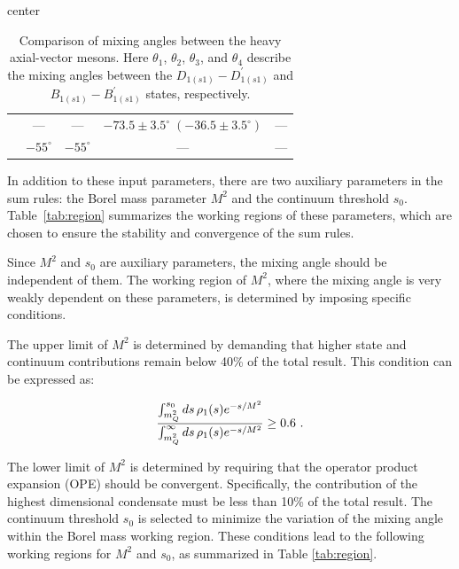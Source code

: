 \documentclass[prd,a4paper,preprint,preprintnumbers,nofootinbib,superscriptaddress]{revtex4-2}
\begin{document}
\begin{table}[hbt]
\begin{adjustbox}{center}
\begin{tabular}{lcccc}
\cite{Sun:2014wea}      & ---                  & ---                  & $-73.5 \pm 3.5^\circ \; (-36.5 \pm 3.5^\circ)$ & --- \\
\cite{Zhong:2008kd}     & $-55^\circ$          & $-55^\circ$          & ---                  & ---                  \\
\bottomrule
\end{tabular}
\end{adjustbox}
\caption{Comparison of mixing angles between the heavy axial-vector mesons. Here $\theta_1$, $\theta_2$, $\theta_3$, and $\theta_4$ describe the mixing angles between the $D_{1(s1)} - D_{1(s1)}^\prime$ and $B_{1(s1)} - B_{1(s1)}^\prime$ states, respectively.}
\label{tab:combined_table}
\end{table}

In addition to these input parameters, there are two  auxiliary parameters in the sum rules: the Borel mass parameter \(M^2\) and the continuum threshold \(s_0\). Table~\ref{tab:region} summarizes the working regions of these parameters, which are chosen to ensure the stability and convergence of the sum rules.


Since \(M^2\) and \(s_0\) are auxiliary parameters, the mixing angle should be independent of them. The working region of \(M^2\), where the mixing angle is very weakly dependent on these parameters, is determined by imposing specific conditions.

The upper limit of \(M^2\) is determined by demanding that higher state and continuum contributions remain below 40\% of the total result. This condition can be expressed as:

\begin{equation}
{\int_{m_Q^2}^{s_0} ds \, \rho_1(s) e^{-s/M^2} \over \int_{m_Q^2}^{\infty} ds \, \rho_1(s) e^{-s/M^2} } \geq 0.6~.
\end{equation}

The lower limit of \(M^2\) is determined by requiring that the operator product expansion (OPE) should be convergent. Specifically, the contribution of the highest dimensional condensate must be less than 10\% of the total result. The continuum threshold \(s_0\) is selected to minimize the variation of the mixing angle within the Borel mass working region. These conditions lead to the following working regions for \(M^2\) and \(s_0\), as summarized in Table \ref{tab:region}.



\end{document}
